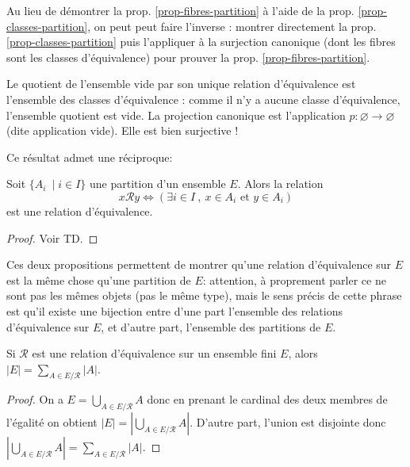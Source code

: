 \begin{remarque}
Au lieu de démontrer la prop. \ref{prop-fibres-partition} à l'aide de la prop. \ref{prop-classes-partition}, on peut peut faire l'inverse : montrer directement la prop. \ref{prop-classes-partition} puis l'appliquer à la surjection canonique (dont les fibres sont les classes d'équivalence) pour prouver  la prop. \ref{prop-fibres-partition}.
\end{remarque}


\begin{remarque}[Zérologie] Le quotient de l'ensemble vide par son unique relation d'équivalence est l'ensemble des classes d'équivalence : comme il n'y a aucune classe d'équivalence, l'ensemble quotient est vide. La projection canonique est l'application $p : \varnothing \to \varnothing$ (dite application vide). Elle est bien surjective !
\end{remarque}

Ce résultat admet une \og réciproque\fg : 

\begin{proposition}
Soit $\{A_i\:\mid i\in I\}$ une partition d'un ensemble $E$. Alors la relation
\[
x\mathcal R y \iff \left( \exists i\in I\:,\: x\in A_i\text{ et } y\in A_i\right)
\]
est une relation d'équivalence.
\end{proposition}
\begin{proof}
Voir TD.
\end{proof}

Ces deux propositions permettent de montrer qu'\og une relation d'équivalence sur $E$ est la même chose qu'une partition de $E$\fg : attention, à proprement parler ce ne sont pas les mêmes objets (pas le même type), mais le sens précis de cette phrase est qu'il existe une bijection entre d'une part l'ensemble des relations d'équivalence sur $E$, et d'autre part, l'ensemble des partitions de $E$.

\begin{corollaire}
Si $\mathcal R$ est une relation d'équivalence sur un ensemble fini $E$, alors $|E| = \sum_{A\in E/\mathcal R} |A|$.
\end{corollaire}
\begin{proof}
On a  $E= \bigcup_{A\in E/\mathcal R} A$ donc en prenant le cardinal des deux membres de l'égalité on obtient $|E| = \left| \bigcup_{A\in E/\mathcal R} A \right|$. D'autre part, l'union est disjointe donc $\left| \bigcup_{A\in E/\mathcal R} A \right| = \sum_{A\in E/\mathcal R} |A|$.
\end{proof}

